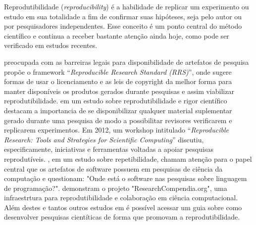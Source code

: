 Reprodutibilidade ({\it reproducibility}) é a habilidade de replicar um experimento
ou estudo em sua totalidade a fim de confirmar suas hipóteses, seja pelo
autor ou por pesquisadores independentes. Esse conceito é um ponto
central do método científico e continua a receber bastante atenção ainda hoje,
como pode ser verificado em estudos recentes.

%

 preocupada com as barreiras legais para
disponibilidade de artefatos de pesquisa propõe o framework ``{\it Reproducible
Research Standard (RRS)}'', onde sugere formas de usar o licenciamento e as leis
de copyright da melhor forma para manter disponíveis os produtos gerados
durante pesquisas e assim viabilizar reprodutibilidade. 
em um estudo sobre reprodutibilidade e rigor científico destacam a importancia
de se disponibilizar qualquer material suplementar gerado durante uma pesquisa
de modo a possibilitar revisores verificarem e replicarem experimentos. Em
2012, um workshop intitulado ``{\it Reproducible Research: Tools and Strategies for
Scientific Computing}'' \cite{Stodden2012} discutiu, especificamente, iniciativas
e ferramentas voltadas a apoiar pesquisas reprodutíveis.
, em um estudo sobre repetibilidade, chamam
atenção para o papel central que os artefatos de software possuem em pesquisas
de ciência da computação e questionam: "Onde está o software nas pesquisas
sobre linguagem de programação?".  demonstram o
projeto "ResearchCompendia.org", uma infraestrtura para reprodutibilidade e
colaboração em ciência computacional. Além destes e tantos outros estudos em
\cite{GithubReproducibilityGuide} é possível acessar um guia sobre como
desenvolver pesquisas cientíticas de forma que promovam a reprodutibilidade.

